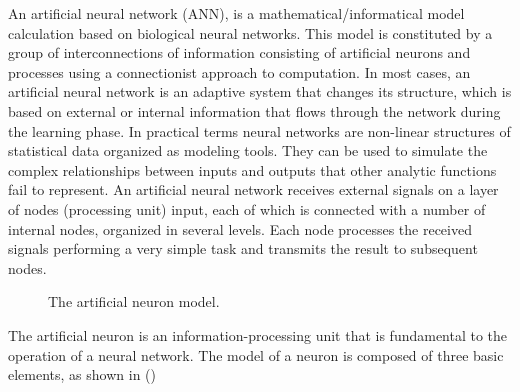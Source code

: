 An artificial neural network (ANN), is a mathematical/informatical model calculation based on biological neural networks.
This model is constituted by a group of interconnections of information consisting of artificial neurons and processes using a connectionist approach to computation. In most cases, an artificial neural network is an adaptive system that changes its structure, which is based on external or internal information that flows through the network during the learning phase. 
In practical terms neural networks are non-linear structures of statistical data organized as modeling tools.
They can be used to simulate the complex relationships between inputs and outputs that other analytic functions fail to represent.
An artificial neural network receives external signals on a layer of nodes (processing unit) input, each of which is connected with a number of internal nodes, organized in several levels. Each node processes the received signals performing a very simple task  and transmits the result to subsequent nodes. 

\begin{figure}[h]
	\centering
	\resizebox{1.05\textwidth}{!}{
	
	}
	\caption[Artificial Neuron Model]{The artificial neuron model.}
	\label{fig:artificial_neuron}
	\end{figure}


The artificial neuron is an information-processing unit that is fundamental to the operation of a neural network. The model of a neuron is composed of three basic elements, as shown in () 

